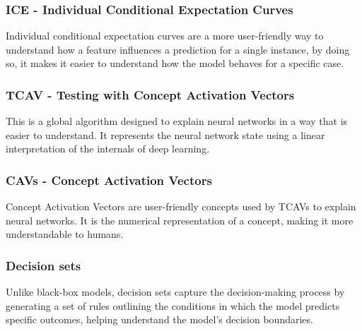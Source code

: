 \documentclass[10pt,journal,compsoc]{IEEEtran}
\begin{document}
\subsubsection{ICE - Individual Conditional Expectation Curves}
Individual conditional expectation curves are a more user-friendly way to understand how a feature influences a prediction for a single instance, by doing so, it makes it easier to understand how the model behaves for a specific case.

\subsubsection{TCAV - Testing with Concept Activation Vectors}
This is a global algorithm designed to explain neural networks in a way that is easier to understand. It represents the neural network state using a linear interpretation of the internals of deep learning.

\subsubsection{CAVs - Concept Activation Vectors}
Concept Activation Vectors are user-friendly concepts used by TCAVs to explain neural networks. It is the numerical representation of a concept, making it more understandable to humans.

\subsubsection{Decision sets}
Unlike black-box models, decision sets capture the decision-making process by generating a set of rules outlining the conditions in which the model predicts specific outcomes, helping understand the model's decision boundaries.
\end{document}
